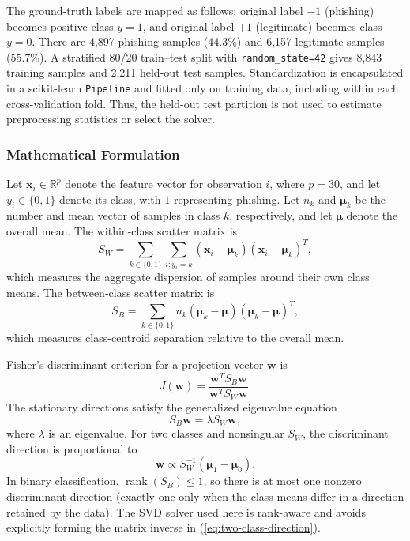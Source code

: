 \documentclass[conference]{IEEEtran}
\begin{document}
The ground-truth labels are mapped as follows: original label $-1$ (phishing) becomes positive class $y=1$, and original label $+1$ (legitimate) becomes class $y=0$. There are 4,897 phishing samples (44.3\%) and 6,157 legitimate samples (55.7\%). A stratified 80/20 train--test split with \texttt{random\_state=42} gives 8,843 training samples and 2,211 held-out test samples. Standardization is encapsulated in a scikit-learn \texttt{Pipeline} and fitted only on training data, including within each cross-validation fold. Thus, the held-out test partition is not used to estimate preprocessing statistics or select the solver.

\subsubsection{Mathematical Formulation}
Let $\mathbf{x}_i\in\mathbb{R}^{p}$ denote the feature vector for observation $i$, where $p=30$, and let $y_i\in\{0,1\}$ denote its class, with $1$ representing phishing. Let $n_k$ and $\boldsymbol{\mu}_k$ be the number and mean vector of samples in class $k$, respectively, and let $\boldsymbol{\mu}$ denote the overall mean. The within-class scatter matrix is
\begin{equation}
 S_W = \sum_{k\in\{0,1\}}\sum_{i:y_i=k}
 (\mathbf{x}_i-\boldsymbol{\mu}_k)(\mathbf{x}_i-\boldsymbol{\mu}_k)^T,
 \label{eq:within-scatter}
\end{equation}
which measures the aggregate dispersion of samples around their own class means. The between-class scatter matrix is
\begin{equation}
 S_B = \sum_{k\in\{0,1\}} n_k
 (\boldsymbol{\mu}_k-\boldsymbol{\mu})
 (\boldsymbol{\mu}_k-\boldsymbol{\mu})^T,
 \label{eq:between-scatter}
\end{equation}
which measures class-centroid separation relative to the overall mean.

Fisher's discriminant criterion for a projection vector $\mathbf{w}$ is
\begin{equation}
 J(\mathbf{w}) =
 \frac{\mathbf{w}^T S_B\mathbf{w}}{\mathbf{w}^T S_W\mathbf{w}}.
 \label{eq:fisher-criterion}
\end{equation}
The stationary directions satisfy the generalized eigenvalue equation
\begin{equation}
 S_B\mathbf{w}=\lambda S_W\mathbf{w},
 \label{eq:generalized-eigenproblem}
\end{equation}
where $\lambda$ is an eigenvalue. For two classes and nonsingular $S_W$, the discriminant direction is proportional to
\begin{equation}
 \mathbf{w}\propto S_W^{-1}
 (\boldsymbol{\mu}_1-\boldsymbol{\mu}_0).
 \label{eq:two-class-direction}
\end{equation}
In binary classification, $\operatorname{rank}(S_B)\leq 1$, so there is at most one nonzero discriminant direction (exactly one only when the class means differ in a direction retained by the data). The SVD solver used here is rank-aware and avoids explicitly forming the matrix inverse in (\ref{eq:two-class-direction}).
\end{document}
